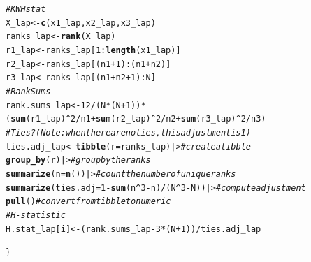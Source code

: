 \documentclass{article}\usepackage[]{graphicx}\usepackage[]{xcolor}
\makeatletter
\newcommand{\hlnum}[1]{\textcolor[rgb]{0.686,0.059,0.569}{#1}}%
\newcommand{\hlcom}[1]{\textcolor[rgb]{0.678,0.584,0.686}{\textit{#1}}}%
\newcommand{\hlopt}[1]{\textcolor[rgb]{0,0,0}{#1}}%
\newcommand{\hldef}[1]{\textcolor[rgb]{0.345,0.345,0.345}{#1}}%
\newcommand{\hlkwb}[1]{\textcolor[rgb]{0.69,0.353,0.396}{#1}}%
\newcommand{\hlkwc}[1]{\textcolor[rgb]{0.333,0.667,0.333}{#1}}%
\newcommand{\hlkwd}[1]{\textcolor[rgb]{0.737,0.353,0.396}{\textbf{#1}}}%
\newenvironment{kframe}{%
 \def\at@end@of@kframe{}%
 \ifinner\ifhmode%
  \def\at@end@of@kframe{\end{minipage}}%
  \begin{minipage}{\columnwidth}%
 \fi\fi%
 \def\FrameCommand##1{\hskip\@totalleftmargin \hskip-\fboxsep
 \colorbox{shadecolor}{##1}\hskip-\fboxsep
     \hskip-\linewidth \hskip-\@totalleftmargin \hskip\columnwidth}%
 \MakeFramed {\advance\hsize-\width
   \@totalleftmargin\z@ \linewidth\hsize
   \@setminipage}}%
 {\par\unskip\endMakeFramed%
 \at@end@of@kframe}
\newenvironment{knitrout}{}{} %
\makeatother
\begin{document}
\begin{enumerate}
\begin{enumerate}
\begin{knitrout}
\begin{kframe}
\begin{alltt}
  \hlcom{# KW H stat}
  \hldef{X_lap} \hlkwb{<-} \hlkwd{c}\hldef{(x1_lap, x2_lap, x3_lap)}
  \hldef{ranks_lap} \hlkwb{<-} \hlkwd{rank}\hldef{(X_lap)}
  \hldef{r1_lap} \hlkwb{<-} \hldef{ranks_lap[}\hlnum{1}\hlopt{:}\hlkwd{length}\hldef{(x1_lap)]}
  \hldef{r2_lap} \hlkwb{<-} \hldef{ranks_lap[(n1}\hlopt{+}\hlnum{1}\hldef{)}\hlopt{:}\hldef{(n1}\hlopt{+}\hldef{n2)]}
  \hldef{r3_lap} \hlkwb{<-} \hldef{ranks_lap[(n1}\hlopt{+}\hldef{n2}\hlopt{+}\hlnum{1}\hldef{)}\hlopt{:}\hldef{N]}
  \hlcom{# Rank Sums}
  \hldef{rank.sums_lap} \hlkwb{<-} \hlnum{12}\hlopt{/}\hldef{(N}\hlopt{*}\hldef{(N}\hlopt{+}\hlnum{1}\hldef{))} \hlopt{*} \hldef{(}\hlkwd{sum}\hldef{(r1_lap)}\hlopt{^}\hlnum{2}\hlopt{/}\hldef{n1} \hlopt{+} \hlkwd{sum}\hldef{(r2_lap)}\hlopt{^}\hlnum{2}\hlopt{/}\hldef{n2} \hlopt{+} \hlkwd{sum}\hldef{(r3_lap)}\hlopt{^}\hlnum{2}\hlopt{/}\hldef{n3)}
  \hlcom{# Ties? (Note: when there are no ties, this adjustment is 1)}
  \hldef{ties.adj_lap} \hlkwb{<-} \hlkwd{tibble}\hldef{(}\hlkwc{r}\hldef{=ranks_lap) |>} \hlcom{# create a tibble}
    \hlkwd{group_by}\hldef{(r) |>}               \hlcom{# group by the ranks}
    \hlkwd{summarize}\hldef{(}\hlkwc{n}\hldef{=}\hlkwd{n}\hldef{())|>}           \hlcom{# count the number of unique ranks}
    \hlkwd{summarize}\hldef{(}\hlkwc{ties.adj} \hldef{=} \hlnum{1}\hlopt{-}\hlkwd{sum}\hldef{(n}\hlopt{^}\hlnum{3}\hlopt{-}\hldef{n)}\hlopt{/}\hldef{(N}\hlopt{^}\hlnum{3}\hlopt{-}\hldef{N))|>} \hlcom{# compute adjustment}
    \hlkwd{pull}\hldef{()} \hlcom{# convert from tibble to numeric}
  \hlcom{# H-statistic}
  \hldef{H.stat_lap[i]} \hlkwb{<-} \hldef{(rank.sums_lap} \hlopt{-} \hlnum{3}\hlopt{*}\hldef{(N}\hlopt{+}\hlnum{1}\hldef{))}\hlopt{/}\hldef{ties.adj_lap}

\hldef{\}}
\end{alltt}
\end{kframe}
\end{knitrout}

\begin{figure}[H]

\centering


\end{figure}
\end{enumerate}
\end{enumerate}
\end{document}
